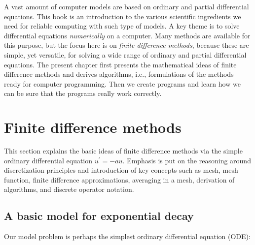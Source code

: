 \documentclass[graybox,sectrefs,envcountresetchap,open=right,final]{svmonodo}
\begin{document}

A vast amount of computer models are based on ordinary and partial
differential equations. This book is an introduction to the
various scientific ingredients we need for reliable computing with such
type of models. A key theme is to solve differential equations
\emph{numerically} on a computer. Many methods are available for this purpose,
but the focus here is on \emph{finite difference methods}, because these
are simple, yet versatile, for solving a wide range of ordinary and
partial differential equations. The present chapter first presents the
mathematical ideas of finite difference methods and derives algorithms,
i.e., formulations of the methods ready for computer programming.
Then we create programs and learn how we can be sure that the programs
really work correctly.


\section{Finite difference methods}

\label{decay:basics}

This section explains the basic ideas of finite difference methods
via the simple ordinary differential equation $u^{\prime}=-au$.
Emphasis is put on the reasoning around discretization principles and
introduction of key concepts such as mesh, mesh function,
finite difference approximations, averaging in a mesh,
derivation of algorithms, and discrete operator notation.

\subsection{A basic model for exponential decay}
\label{decay:model}

 

Our model problem is perhaps the simplest ordinary differential
equation (ODE):
\end{document}
